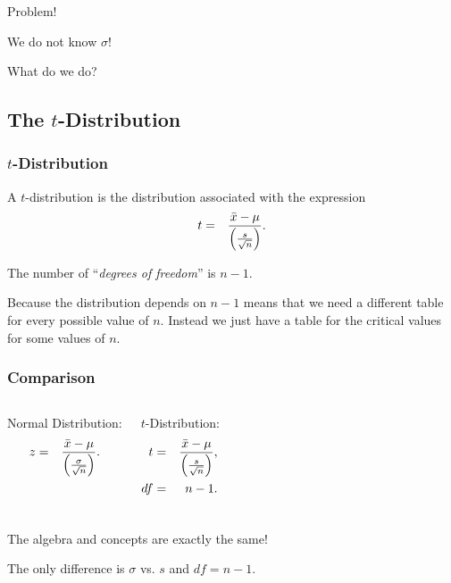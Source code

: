 \begin{frame}{Problem!}

  We do not know $\sigma$!

  What do we do?
  
\end{frame}





\subsection{The $t$-Distribution}


\begin{frame}
  \frametitle{$t$-Distribution}

  \begin{definition}[$t$-Distribution]

    A $t$-distribution is the distribution associated with the expression
    \begin{eqnarray*}
      t &  = & \frac{\bar{x}-\mu}{\left( \frac{s}{\sqrt{n}} \right)}.
    \end{eqnarray*}

    The number of ``\textit{degrees of freedom}'' is $n-1$.
    
  \end{definition}

  Because the distribution depends on $n-1$ means that we need a
  different table for every possible value of $n$. Instead we just
  have a table for the critical values for some values of $n$.
  

\end{frame}



\begin{frame}
  \frametitle{Comparison}

  \begin{columns}
    Normal Distribution:
    \begin{eqnarray*}
      z &  = & \frac{\bar{x}-\mu}{\left( \frac{\sigma}{\sqrt{n}} \right)}.
    \end{eqnarray*}

    $t$-Distribution:
    \begin{eqnarray*}
      t &  = & \frac{\bar{x}-\mu}{\left( \frac{s}{\sqrt{n}} \right)}, \\
      df & = & n-1.
    \end{eqnarray*}

  \end{columns}

  \vfill

    {

      \begin{center}
        The algebra and concepts are exactly the same!

        The only difference is $\sigma$ vs. $s$ and $df=n-1$.
      \end{center}
    }

    \vfill
  

\end{frame}



